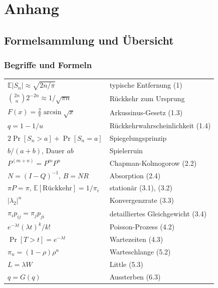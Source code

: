 \appendix
\part{Anhang}

\newcommand{\lit}[3]{\vspace{5pt}\noindent\textbf{[#1]} #2\par\nopagebreak\vspace{1pt}{\small\itshape\color{grau} #3}\par\vspace{2pt}}

\chapter{Formelsammlung und Übersicht}

\section{Begriffe und Formeln}

\begin{merksatz}
\begin{center}
{\small
\renewcommand{\arraystretch}{1.6}
\begin{tabular}{@{}P{4.4cm}P{4.2cm}@{}}
\toprule
$\mathbb{E}|S_n| \approx \sqrt{2n/\pi}$ & typische Entfernung (1)\\
$\binom{2n}{n}2^{-2n} \approx 1/\sqrt{\pi n}$ & Rückkehr zum Ursprung\\
$F(x) = \tfrac2\pi\arcsin\sqrt x$ & Arkussinus-Gesetz (1.3)\\
$q = 1 - 1/u$ & Rückkehr\-wahrschein\-lichkeit (1.4)\\
$2\Pr[S_n > a] + \Pr[S_n = a]$ & Spiegelungsprinzip\\
$b/(a+b)$, Dauer $ab$ & Spielerruin\\
$P^{(m+n)} = P^{m}P^{n}$ & Chapman-Kolmogorow (2.2)\\
$N = (I-Q)^{-1}$, $B = NR$ & Absorption (2.4)\\
$\pi P = \pi$, $\mathbb{E}[\text{Rückkehr}] = 1/\pi_i$ & stationär (3.1), (3.2)\\
$|\lambda_2|^{n}$ & Konvergenzrate (3.3)\\
$\pi_i p_{ij} = \pi_j p_{ji}$ & detailliertes Gleichgewicht (3.4)\\
$e^{-\lambda t}(\lambda t)^{k}/k!$ & Poisson-Prozess (4.2)\\
$\Pr[T>t] = e^{-\lambda t}$ & Wartezeiten (4.3)\\
$\pi_n = (1-\rho)\rho^{n}$ & Warteschlange (5.2)\\
$L = \lambda W$ & Little (5.3)\\
$q = G(q)$ & Aussterben (6.3)\\
\bottomrule
\end{tabular}}
\end{center}
\end{merksatz}

